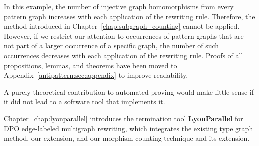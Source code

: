\begin{center}
\end{center}
In this example, the number of injective graph homomorphisms from every pattern graph increases with each application of the rewriting rule. Therefore, the method introduced in Chapter~\ref{chap:subgraph_counting} cannot be applied. However, if we restrict our attention to occurrences of pattern graphs that are not part of a larger occurrence of a specific graph, the number of such occurrences decreases with each application of the rewriting rule. 
Proofs of all propositions, lemmas, and theorems have been moved to Appendix~\ref{antipattern:sec:appendix} to improve readability.

A purely theoretical contribution to automated proving would make little sense if it did not lead to a software tool that implements it.

Chapter~\ref{chap:lyonparallel} introduces the termination tool \textbf{LyonParallel} for DPO edge-labeled multigraph rewriting, which integrates the existing type graph method, our extension, and our morphism counting technique and its extension.  